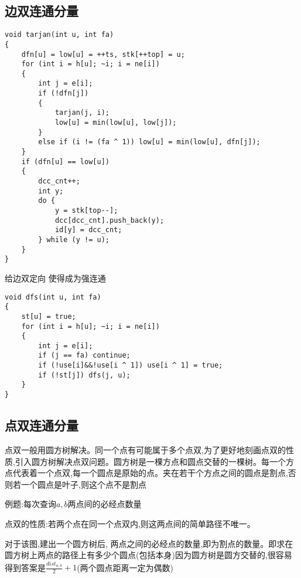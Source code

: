 \documentclass[a4paper,fontset=none]{ctexart}
\begin{document}
\subsection{边双连通分量}

\begin{verbatim}
void tarjan(int u, int fa)
{
    dfn[u] = low[u] = ++ts, stk[++top] = u;
    for (int i = h[u]; ~i; i = ne[i])
    {
        int j = e[i];
        if (!dfn[j])
        {
            tarjan(j, i);
            low[u] = min(low[u], low[j]);
        }
        else if (i != (fa ^ 1)) low[u] = min(low[u], dfn[j]);
    }
    if (dfn[u] == low[u])
    {
        dcc_cnt++;
        int y;
        do {
            y = stk[top--];
            dcc[dcc_cnt].push_back(y);
            id[y] = dcc_cnt;
        } while (y != u);
    }
}
\end{verbatim}

给边双定向 使得成为强连通

\begin{verbatim}
void dfs(int u, int fa)
{
    st[u] = true;
    for (int i = h[u]; ~i; i = ne[i])
    {
        int j = e[i];
        if (j == fa) continue;
        if (!use[i]&&!use[i ^ 1]) use[i ^ 1] = true;
        if (!st[j]) dfs(j, u);
    }
}
\end{verbatim}
\subsection{点双连通分量}
点双一般用圆方树解决。同一个点有可能属于多个点双,为了更好地刻画点双的性质,引入圆方树解决点双问题。圆方树是一棵方点和圆点交替的一棵树。每一个方点代表着一个点双,每一个圆点是原始的点。夹在若干个方点之间的圆点是割点,否则若一个圆点是叶子,则这个点不是割点

例题:每次查询$a,b$两点间的必经点数量

点双的性质:若两个点在同一个点双内,则这两点间的简单路径不唯一。

对于该图,建出一个圆方树后, 两点之间的必经点的数量,即为割点的数量。即求在圆方树上两点的路径上有多少个圆点(包括本身)因为圆方树是圆方交替的,很容易得到答案是$\frac{dist_{a,b}}{2}+1$(两个圆点距离一定为偶数)
\end{document}
